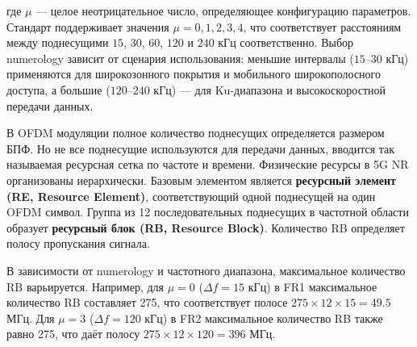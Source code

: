\noindent где $\mu$ — целое неотрицательное число, определяющее конфигурацию параметров. 
Стандарт поддерживает значения $\mu = 0, 1, 2, 3, 4$, что соответствует расстояниям между 
поднесущими $15$, $30$, $60$, $120$ и $240$ кГц соответственно. 
Выбор numerology зависит от сценария использования: меньшие интервалы ($15$–$30$ кГц) 
применяются для широкозонного покрытия и мобильного широкополосного доступа, 
а большие ($120$–$240$ кГц) — для Ku-диапазона и высокоскоростной передачи данных.


В OFDM модуляции полное количество поднесущих определяется размером БПФ. Но не все поднесущие используются для передачи данных, 
вводится так называемая ресурсная сетка по частоте и времени.
Физические ресурсы в 5G NR организованы иерархически. Базовым элементом является \textbf{ресурсный элемент (RE, Resource Element)},
соответствующий одной поднесущей на один OFDM символ. Группа из 12 последовательных поднесущих в частотной области образует \textbf{ресурсный блок (RB, Resource Block)}.
Количество RB определяет полосу пропускания сигнала.

В зависимости от numerology и частотного диапазона, максимальное количество RB варьируется. 
Например, для $\mu = 0$ ($\Delta f = 15$ кГц) в FR1 максимальное количество RB составляет 275, 
что соответствует полосе $275 \times 12 \times 15 = 49.5$ МГц. Для $\mu = 3$ ($\Delta f = 120$ кГц) 
в FR2 максимальное количество RB также равно 275, что даёт полосу $275 \times 12 \times 120 = 396$ МГц.


